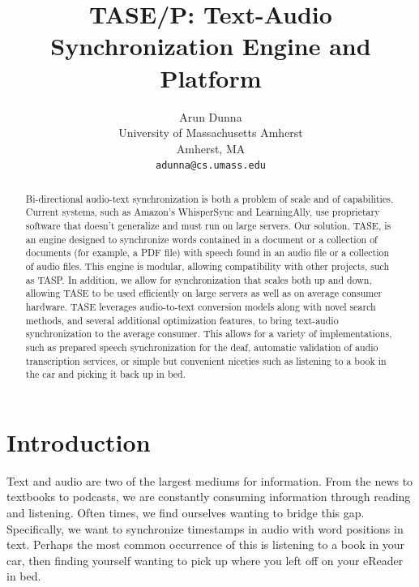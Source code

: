 \documentclass[10pt,twocolumn,letterpaper]{article}
\begin{document}
\title{TASE/P: Text-Audio Synchronization Engine and Platform}

\author{Arun Dunna\\
University of Massachusetts Amherst\\
Amherst, MA\\
{\tt\small adunna@cs.umass.edu}
}

\maketitle

\begin{abstract}
Bi-directional audio-text synchronization is both a problem of scale and of capabilities. Current systems, such as Amazon's WhisperSync\cite{} and LearningAlly\cite{}, use proprietary software that doesn't generalize and must run on large servers. Our solution, TASE, is an engine designed to synchronize words contained in a document or a collection of documents (for example, a PDF file) with speech found in an audio file or a collection of audio files. This engine is modular, allowing compatibility with other projects, such as TASP. In addition, we allow for synchronization that scales both up and down, allowing TASE to be used efficiently on large servers as well as on average consumer hardware. TASE leverages audio-to-text conversion models along with novel search methods, and several additional optimization features, to bring text-audio synchronization to the average consumer. This allows for a variety of implementations, such as prepared speech synchronization for the deaf, automatic validation of audio transcription services, or simple but convenient niceties such as listening to a book in the car and picking it back up in bed.
\end{abstract}

\section{Introduction}
Text and audio are two of the largest mediums for information. From the news to textbooks to podcasts, we are constantly consuming information through reading and listening. Often times, we find ourselves wanting to bridge this gap. Specifically, we want to synchronize timestamps in audio with word positions in text. Perhaps the most common occurrence of this is listening to a book in your car, then finding yourself wanting to pick up where you left off on your eReader in bed.
\end{document}
